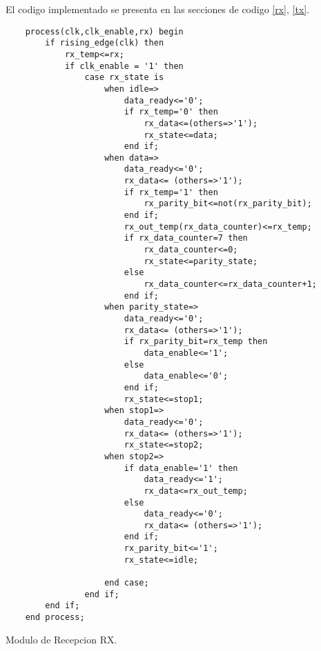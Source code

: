 \documentclass[paper=a4, fontsize=12pt]{article}        %
\numberwithin{equation}{section}                        %
\numberwithin{table}{section}                           %
\begin{document}
El codigo implementado se presenta en las secciones de codigo \ref{rx}, \ref{tx}.
\begin{listing}[H]
    \begin{verbatim}
    process(clk,clk_enable,rx) begin
        if rising_edge(clk) then
            rx_temp<=rx;
            if clk_enable = '1' then
                case rx_state is
                    when idle=>
                        data_ready<='0';
                        if rx_temp='0' then
                            rx_data<=(others=>'1');
                            rx_state<=data;
                        end if;
                    when data=>
                        data_ready<='0';
                        rx_data<= (others=>'1');
                        if rx_temp='1' then
                            rx_parity_bit<=not(rx_parity_bit);
                        end if;
                        rx_out_temp(rx_data_counter)<=rx_temp;
                        if rx_data_counter=7 then
                            rx_data_counter<=0;
                            rx_state<=parity_state;
                        else
                            rx_data_counter<=rx_data_counter+1;
                        end if;
                    when parity_state=>
                        data_ready<='0';
                        rx_data<= (others=>'1');
                        if rx_parity_bit=rx_temp then
                            data_enable<='1';
                        else
                            data_enable<='0';
                        end if;
                        rx_state<=stop1;
                    when stop1=>
                        data_ready<='0';
                        rx_data<= (others=>'1');
                        rx_state<=stop2;
                    when stop2=>
                        if data_enable='1' then
                            data_ready<='1';
                            rx_data<=rx_out_temp;
                        else
                            data_ready<='0';
                            rx_data<= (others=>'1');
                        end if;
                        rx_parity_bit<='1';
                        rx_state<=idle;
                        
                    end case;
                end if;
        end if;
    end process;
\end{verbatim}
\caption{Modulo de Recepcion RX.}
    \label{rx}
\end{listing}
\end{document}
